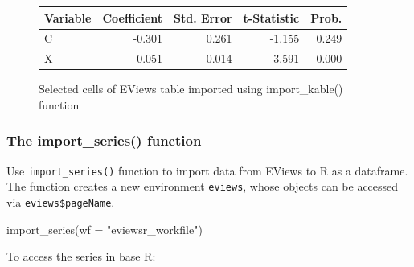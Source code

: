 \documentclass[
  letterpaper,
  DIV=11,
  numbers=noendperiod]{scrartcl}
\newenvironment{Shaded}{\begin{snugshade}}{\end{snugshade}}
\newcommand{\AttributeTok}[1]{\textcolor[rgb]{0.40,0.45,0.13}{#1}}
\newcommand{\FunctionTok}[1]{\textcolor[rgb]{0.28,0.35,0.67}{#1}}
\newcommand{\NormalTok}[1]{\textcolor[rgb]{0.00,0.23,0.31}{#1}}
\newcommand{\SpecialCharTok}[1]{\textcolor[rgb]{0.37,0.37,0.37}{#1}}
\newcommand{\StringTok}[1]{\textcolor[rgb]{0.13,0.47,0.30}{#1}}
\begin{document}
\begin{figure}

\begin{minipage}[t]{0.50\linewidth}

{\centering 

\caption{Selected cells of EViews table imported using import\_kable() function}
\centering
\begin{tabular}[t]{lrrrr}
\toprule
Variable & Coefficient & Std. Error & t-Statistic & Prob.\\
\midrule
C & -0.301 & 0.261 & -1.155 & 0.249\\
X & -0.051 & 0.014 & -3.591 & 0.000\\
\bottomrule
\end{tabular}

}

\end{minipage}%

\end{figure}

\hypertarget{the-import_series-function}{%
\subsubsection{The import\_series()
function}\label{the-import_series-function}}

Use \texttt{import\_series()} function to import data from EViews to R
as a dataframe. The function creates a new environment \texttt{eviews},
whose objects can be accessed via \texttt{eviews\$pageName}.

\begin{Shaded}
\begin{Highlighting}[]
\FunctionTok{import\_series}\NormalTok{(}\AttributeTok{wf =} \StringTok{"eviewsr\_workfile"}\NormalTok{)}
\end{Highlighting}
\end{Shaded}

\begin{figure}

\end{figure}

To access the series in base R:

\begin{Shaded}
\end{Shaded}
\end{document}
